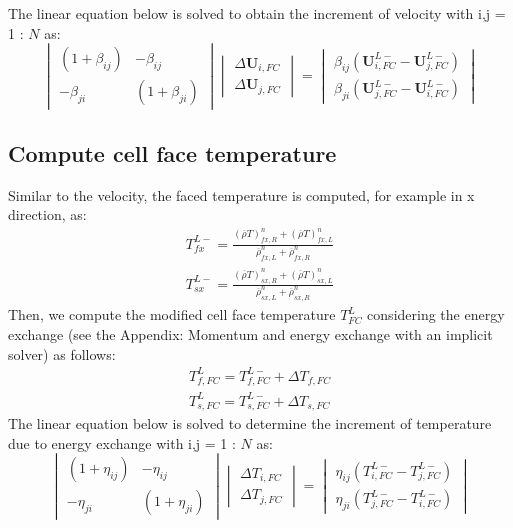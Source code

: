 \documentclass[preprint,12pt]{elsarticle}
\begin{document}
%
%
The linear equation below is solved to obtain the increment of velocity with i,j = 1 : $N$ as:
%
%
\[ \begin{vmatrix} (1 + \beta_{ij})  &  -\beta_{ij} \\
                  -\beta_{ji}       &  (1 + \beta_{ji})
    \end {vmatrix}
    \begin{vmatrix} \Delta \pmb{U}_{i,FC} \\
                    \Delta \pmb{U}_{j,FC}
    \end {vmatrix}
    =
    \begin{vmatrix}  \beta_{ij}(\pmb{U}_{i,FC}^{L-} - \pmb{U}_{j,FC}^{L-}) \\
                    \beta_{ji}(\pmb{U}_{j,FC}^{L-} - \pmb{U}_{i,FC}^{L-})
    \end {vmatrix}                
\]
%
%
\subsection{\textsf{Compute cell face temperature}}
Similar to the velocity, the faced temperature is computed, for example in x direction, as:
%
\begin{equation}
\begin{gathered}
T_{fx}^{L-} = \frac{(\overline{\rho} T)_{fx,R}^n + (\overline{\rho} T)_{fx,L}^n}{\overline{\rho}_{fx,L}^n + \overline{\rho}_{fx,R}^n} \\
T_{sx}^{L-} = \frac{(\overline{\rho} T)_{sx,R}^n + (\overline{\rho} T)_{sx,L}^n}{\overline{\rho}_{sx,L}^n + \overline{\rho}_{sx,R}^n} 
\end {gathered}
\end {equation}
%
%
Then, we compute the modified cell face temperature $T_{FC}^{L}$ considering the energy exchange (see the Appendix: Momentum and energy exchange with an implicit solver) as follows:
%
\begin{equation}
\begin{gathered}
   T_{f,FC}^{L} = T_{f,FC}^{L-} + \Delta T_{f,FC}\\
   T_{s,FC}^{L} = T_{s,FC}^{L-} + \Delta T_{s,FC}
\end {gathered}
\end {equation}
%
%
The linear equation below is solved to determine the increment of temperature due to energy exchange with i,j = 1 : $N$ as:
%
%
\[ \begin{vmatrix} (1 + \eta_{ij})  &  -\eta_{ij} \\
                  -\eta_{ji}       &  (1 + \eta_{ji})
    \end {vmatrix}
    \begin{vmatrix} \Delta T_{i,FC} \\
                    \Delta T_{j,FC}
    \end {vmatrix}
    =
    \begin{vmatrix}  \eta_{ij}(T_{i,FC}^{L-} - T_{j,FC}^{L-}) \\
                    \eta_{ji}(T_{j,FC}^{L-} - T_{i,FC}^{L-})
    \end {vmatrix}                
\]
%
%
\end{document}
